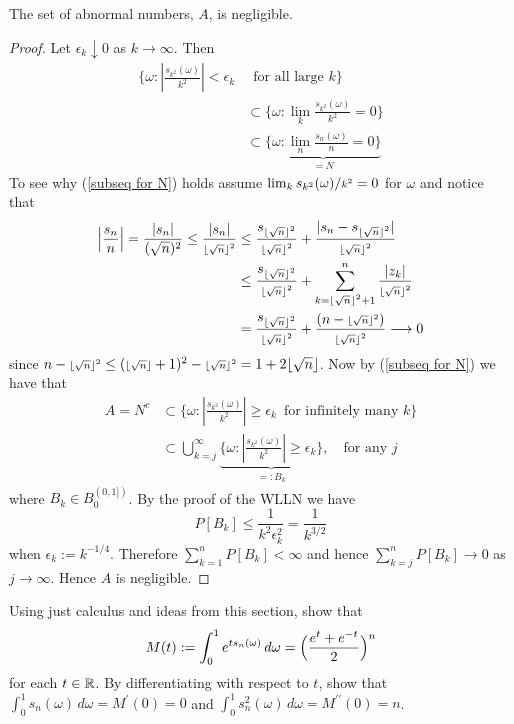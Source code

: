 \begin{theorem}
\label{thm: Borel's normal number theorem}
The set of abnormal numbers, $A$,  is negligible.
\end{theorem}
\begin{proof}
Let $\epsilon_k\downarrow 0$ as $k\rightarrow \infty$. Then
\begin{align}
\{\omega \colon |\textstyle\frac{s_{k^2}(\omega)}{k^2}| < \epsilon_k&\, \text{ for all large $k$} \} \nonumber\\
&\subset  \{\omega\colon \textstyle\lim_{k}\textstyle\frac{s_{k^2}(\omega)}{k^2} = 0 \}  \nonumber\\
&\subset \underbrace{\{\omega\colon \textstyle\lim_{n}\textstyle\frac{s_{n}(\omega)}{n} = 0 \}}_{= N}  \label{subseq for N}
\end{align}
To see why (\ref{subseq for N}) holds assume $\lim_k s_{k^2}(\omega)/\text{\scriptsize $k^2$} = 0$ for  $\omega$ and notice that
\newcommand{\tempn}{\text{\scriptsize $\lfloor\sqrt{n}\rfloor^2$}}
\begin{align*}
 \left|\frac{s_n}{n} \right| = \frac{|s_n|}{ (\sqrt{n})^{2} }
 \leq \frac{|s_n|}{\tempn} &\leq \frac{s_{\tempn}}{\tempn} + \frac{|s_n - s_\tempn|}{\tempn} \\
 & \leq \frac{s_{\tempn}}{\tempn} + \sum_{k = \tempn +1}^n \frac{|z_k|}{\tempn} \\
 & = {\frac{s_{\tempn}}{\tempn}} + \frac{(n-\tempn)}{\tempn} \longrightarrow 0
 \end{align*}
since $n-\tempn \leq (\text{\scriptsize $\lfloor\sqrt{n}\rfloor$} + 1)^2 - \tempn = 1 + 2\lfloor\sqrt{n} \rfloor $. Now by (\ref{subseq for N}) we have that
\begin{align*}
A = N^c  &\subset \{\omega \colon |\textstyle\frac{s_{k^2}(\omega)}{k^2}| \geq \epsilon_k\, \text{ for infinitely many $k$} \} \\
&\subset \bigcup_{k=j}^\infty  \underbrace{\{\omega \colon  |\textstyle\frac{s_{k^2}(\omega)}{k^2}| \geq \epsilon_k \}}_{=: B_k},\quad\text{for any $j$}
\end{align*}
where $B_k\in B_0^{(0,1])}$. By the proof of the WLLN we have
\[
P[B_k]\leq \frac{1}{k^2 \epsilon^2_k} = \frac{1}{k^{3/2}}
\]
when $\epsilon_k:= k^{-1/4}$. Therefore $\sum_{k=1}^n P[B_k]<\infty$ and hence $\sum_{k=j}^n P[B_k]\rightarrow 0$ as $j\rightarrow \infty$. Hence $A$ is negligible.
\end{proof}


\begin{exercise}
Using just calculus and ideas from this section, show that
\begin{equation}
\label{ex1a}
 M(t):= \int_0^1 e^{ts_n(\omega)}\,d\omega = \Bigl(\frac{e^t+e^{-t}}{2} \Bigr)^n
 \end{equation}
for each $t\in\Bbb R$. By differentiating with respect to $t$, show that $\int_0^1 s_n(\omega) \,d\omega = M^\prime (0)=0$ and $\int_0^1 s_n^2(\omega)\, d\omega =M^{\prime\prime} (0)=n$.
\end{exercise}

